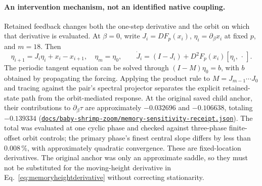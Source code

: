 \documentclass[11pt,letterpaper]{article}
\newcommand{\repourl}{https://github.com/tdj28/neural-shrimp}
\newcommand{\memoryrepo}[1]{\href{\repourl/blob/d2a15964bdae9358ad2dbc363980a10294b2cb2e/#1}{\nolinkurl{#1}}}
\begin{document}
\paragraph{An intervention mechanism, not an identified native coupling.} Retained feedback changes both the
one-step derivative and the orbit on which that derivative is evaluated. At $\beta=0$, write $J_i=DF_p(x_i)$,
$\eta_i=\partial_\beta x_i$ at fixed $p$, and $m=18$. Then
\begin{equation}
 \eta_{i+1}=J_i\eta_i+x_i-x_{i+1},\quad \eta_m=\eta_0,\qquad
 \dot J_i=(I-J_i)+D^2F_p(x_i)[\eta_i,\,\cdot\,].
 \label{eq:memoryresponse}
\end{equation}
The periodic tangent equation can be solved through $(I-M)\eta_0=b$, with $b$ obtained by propagating the
forcing. Applying the product rule to $M=J_{m-1}\cdots J_0$ and tracing against the pair's spectral projector
separates the explicit retained-state path from the orbit-mediated response. At the original saved child anchor,
their contributions to $\partial_\beta\tau$ are approximately $-0.032696$ and $-0.106638$, totaling
$-0.139334$ (\memoryrepo{docs/baby-shrimp-zoom/memory-sensitivity-receipt.json}). The total was evaluated at one cyclic
phase and checked against three-phase finite-offset orbit controls; the primary phase's finest central slope
differs by less than 0.008\,\%, with approximately quadratic convergence. These are fixed-location derivatives.
The original anchor was only an approximate saddle, so they must not be substituted for the moving-height
derivative in Eq.~\eqref{eq:memoryheightderivative} without correcting stationarity.
\end{document}
